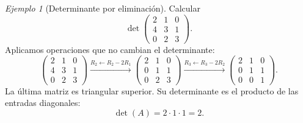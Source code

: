 \documentclass[12pt]{article}
\theoremstyle{remark}
\newtheorem{ejemplo}[definicion]{Ejemplo}
\begin{document}
\begin{ejemplo}[Determinante por eliminación]
Calcular
\[
\det\begin{pmatrix}2&1&0\\4&3&1\\0&2&3\end{pmatrix}.
\]
Aplicamos operaciones que no cambian el determinante:
\[
\begin{pmatrix}2&1&0\\4&3&1\\0&2&3\end{pmatrix}
\xrightarrow{R_2\leftarrow R_2-2R_1}
\begin{pmatrix}2&1&0\\0&1&1\\0&2&3\end{pmatrix}
\xrightarrow{R_3\leftarrow R_3-2R_2}
\begin{pmatrix}2&1&0\\0&1&1\\0&0&1\end{pmatrix}.
\]
La última matriz es triangular superior. Su determinante es el producto de las entradas diagonales:
\[
\boxed{\det(A)=2\cdot1\cdot1=2}.
\]
\end{ejemplo}
\end{document}
